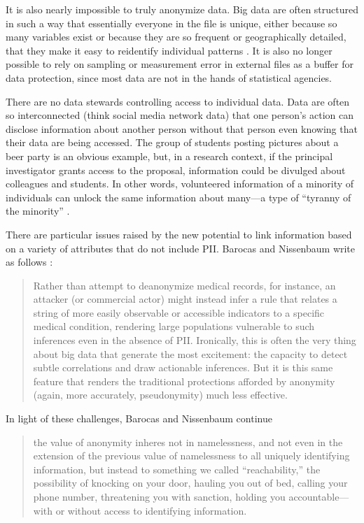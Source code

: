 \documentclass[]{krantz}
\begin{document}
It is also nearly impossible to truly anonymize data. Big data are often
structured in such a way that essentially everyone in the file is
unique, either because so many variables exist or because they are so
frequent or geographically detailed, that they make it easy to
reidentify individual patterns \citep{narayanan2008robust}. It is also
no longer possible to rely on sampling or measurement error in external
files as a buffer for data protection, since most data are not in the
hands of statistical agencies.

There are no data stewards controlling access to individual data. Data
are often so interconnected (think social media network data) that one
person's action can disclose information about another person without
that person even knowing that their data are being accessed. The group
of students posting pictures about a beer party is an obvious example,
but, in a research context, if the principal investigator grants access
to the proposal, information could be divulged about colleagues and
students. In other words, volunteered information of a minority of
individuals can unlock the same information about many---a type of
``tyranny of the minority'' \citep{barocas2014bigger}.

There are particular issues raised by the new potential to link
information based on a variety of attributes that do not include PII.
Barocas and Nissenbaum write as follows \citep{barocas2014big}:

\begin{quote}
Rather than attempt to deanonymize medical records, for instance, an
attacker (or commercial actor) might instead infer a rule that relates a
string of more easily observable or accessible indicators to a specific
medical condition, rendering large populations vulnerable to such
inferences even in the absence of PII. Ironically, this is often the
very thing about big data that generate the most excitement: the
capacity to detect subtle correlations and draw actionable inferences.
But it is this same feature that renders the traditional protections
afforded by anonymity (again, more accurately, pseudonymity) much less
effective.
\end{quote}

In light of these challenges, Barocas and Nissenbaum continue

\begin{quote}
the value of anonymity inheres not in namelessness, and not even in the
extension of the previous value of namelessness to all uniquely
identifying information, but instead to something we called
``reachability,'' the possibility of knocking on your door, hauling you
out of bed, calling your phone number, threatening you with sanction,
holding you accountable---with or without access to identifying
information.
\end{quote}
\end{document}
